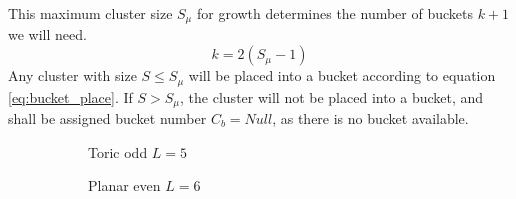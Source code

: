 This maximum cluster size $S_\mu$ for growth determines the number of buckets $k + 1$ we will need.
\begin{equation}\label{eq:bucket_numbuckets}
  k = 2(S_\mu-1)
\end{equation}
Any cluster with size $S\leq S_\mu$ will be placed into a bucket according to equation \ref{eq:bucket_place}. If $S>S_\mu$, the cluster will not be placed into a bucket, and shall be assigned bucket number $C_b=Null$, as there is no bucket available.


\def\QS{10}
\def\s{1}
\begin{figure}[h]
  \centering

  \begin{subfigure}{0.45\linewidth}
    \centering
        \caption{Toric odd $L=5$}
  \end{subfigure}
  \hspace{1cm}
  \begin{subfigure}{0.45\linewidth}
    \centering
    \caption{Planar even $L=6$}
  \end{subfigure}
  \begin{subfigure}{0.45\linewidth}
    \centering
\end{subfigure}
\end{figure}
